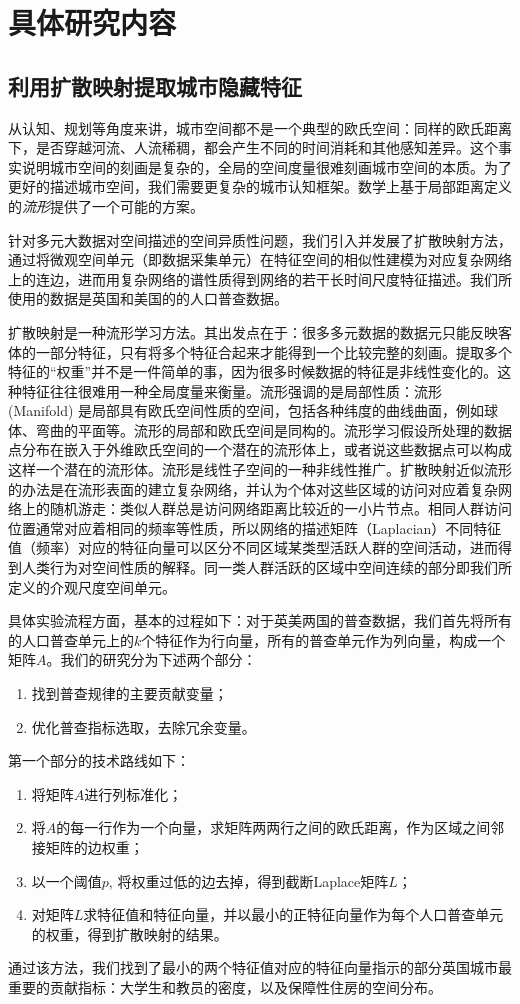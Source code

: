 \section{具体研究内容}

\subsection{利用扩散映射提取城市隐藏特征}

从认知、规划等角度来讲，城市空间都不是一个典型的欧氏空间：同样的欧氏距离下，是否穿越河流、人流稀稠，都会产生不同的时间消耗和其他感知差异。这个事实说明城市空间的刻画是复杂的，全局的空间度量很难刻画城市空间的本质。为了更好的描述城市空间，我们需要更复杂的城市认知框架。数学上基于局部距离定义的\textit{流形}提供了一个可能的方案。

针对多元大数据对空间描述的空间异质性问题，我们引入并发展了扩散映射方法，通过将微观空间单元（即数据采集单元）在特征空间的相似性建模为对应复杂网络上的连边，进而用复杂网络的谱性质得到网络的若干长时间尺度特征描述。我们所使用的数据是英国和美国的的人口普查数据。

扩散映射是一种流形学习方法。其出发点在于：很多多元数据的数据元只能反映客体的一部分特征，只有将多个特征合起来才能得到一个比较完整的刻画。提取多个特征的“权重”并不是一件简单的事，因为很多时候数据的特征是非线性变化的。这种特征往往很难用一种全局度量来衡量。流形强调的是局部性质：流形 (Manifold) 是局部具有欧氏空间性质的空间，包括各种纬度的曲线曲面，例如球体、弯曲的平面等。流形的局部和欧氏空间是同构的。流形学习假设所处理的数据点分布在嵌入于外维欧氏空间的一个潜在的流形体上，或者说这些数据点可以构成这样一个潜在的流形体。流形是线性子空间的一种非线性推广。扩散映射近似流形的办法是在流形表面的建立复杂网络，并认为个体对这些区域的访问对应着复杂网络上的随机游走：类似人群总是访问网络距离比较近的一小片节点。相同人群访问位置通常对应着相同的频率等性质，所以网络的描述矩阵（Laplacian）不同特征值（频率）对应的特征向量可以区分不同区域某类型活跃人群的空间活动，进而得到人类行为对空间性质的解释。同一类人群活跃的区域中空间连续的部分即我们所定义的介观尺度空间单元。

具体实验流程方面，基本的过程如下：对于英美两国的普查数据，我们首先将所有的人口普查单元上的$k$个特征作为行向量，所有的普查单元作为列向量，构成一个矩阵$A$。我们的研究分为下述两个部分：\begin{enumerate}
    \item 找到普查规律的主要贡献变量；
    \item 优化普查指标选取，去除冗余变量。
\end{enumerate}
第一个部分的技术路线如下：\begin{enumerate}
    \item 将矩阵$A$进行列标准化；
    \item 将$A$的每一行作为一个向量，求矩阵两两行之间的欧氏距离，作为区域之间邻接矩阵的边权重；
    \item 以一个阈值$p$, 将权重过低的边去掉，得到截断Laplace矩阵$L$；
    \item 对矩阵$L$求特征值和特征向量，并以最小的正特征向量作为每个人口普查单元的权重，得到扩散映射的结果。
\end{enumerate} 通过该方法，我们找到了最小的两个特征值对应的特征向量指示的部分英国城市最重要的贡献指标：大学生和教员的密度，以及保障性住房的空间分布。

